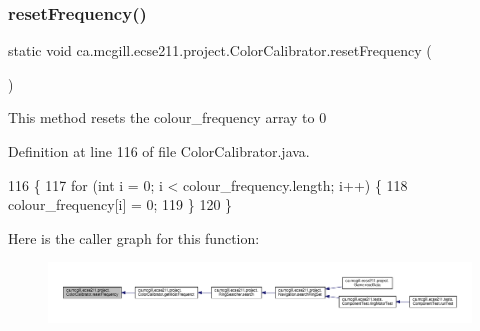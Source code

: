 \mbox{\label{classca_1_1mcgill_1_1ecse211_1_1project_1_1_color_calibrator_ab6148d75e3a105016580e90ed1ea9bc9}} 
\subsubsection{\texorpdfstring{reset\+Frequency()}{resetFrequency()}}
{\footnotesize\ttfamily static void ca.\+mcgill.\+ecse211.\+project.\+Color\+Calibrator.\+reset\+Frequency (\begin{DoxyParamCaption}{ }\end{DoxyParamCaption})\hspace{0.3cm}{\ttfamily [static]}}

This method resets the colour\+\_\+frequency array to 0 

Definition at line 116 of file Color\+Calibrator.\+java.


\begin{DoxyCode}
116                                       \{
117     \textcolor{keywordflow}{for} (\textcolor{keywordtype}{int} i = 0; i < colour\_frequency.length; i++) \{
118       colour\_frequency[i] = 0;
119     \}
120   \}
\end{DoxyCode}
Here is the caller graph for this function\+:\nopagebreak
\begin{figure}[H]
\begin{center}
\leavevmode
\includegraphics[width=350pt]{classca_1_1mcgill_1_1ecse211_1_1project_1_1_color_calibrator_ab6148d75e3a105016580e90ed1ea9bc9_icgraph}
\end{center}
\end{figure}
\mbox{\label{classca_1_1mcgill_1_1ecse211_1_1project_1_1_color_calibrator_a40906193773ead0bfd582f188413c97a}} 
